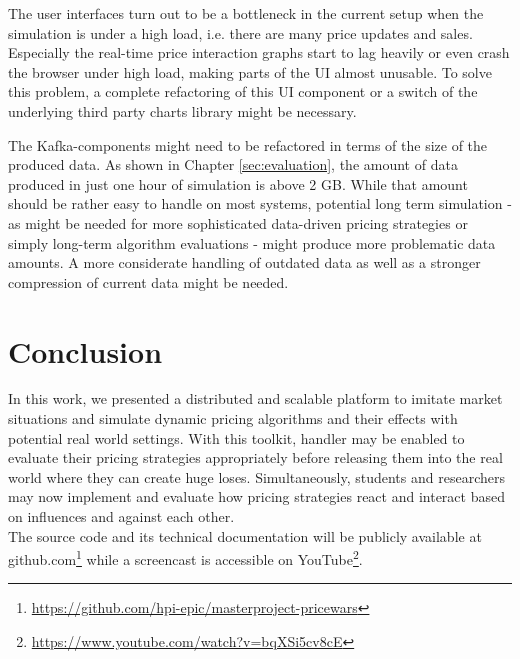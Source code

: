 The user interfaces turn out to be a bottleneck in the current setup when the simulation is under a high load, i.e. there are many price updates and sales. Especially the real-time price interaction graphs start to lag heavily or even crash the browser under high load, making parts of the UI almost unusable. To solve this problem, a complete refactoring of this UI component or a switch of the underlying third party charts library might be necessary.

The Kafka-components might need to be refactored in terms of the size of the produced data. As shown in Chapter \ref{sec:evaluation}, the amount of data produced in just one hour of simulation is above 2 GB. While that amount should be rather easy to handle on most systems, potential long term simulation - as might be needed for more sophisticated data-driven pricing strategies or simply long-term algorithm evaluations - might produce more problematic data amounts. A more considerate handling of outdated data as well as a stronger compression of current data might be needed. 



\section{Conclusion}
\label{sec:conclusion}
%
In this work, we presented a distributed and scalable platform to imitate market situations and simulate dynamic pricing algorithms and their effects with potential real world settings. With this toolkit, handler may be enabled to evaluate their pricing strategies appropriately before releasing them into the real world where they can create huge loses. Simultaneously, students and researchers may now implement and evaluate how pricing strategies react and interact based on influences and against each other.\\

The source code and its technical documentation will be publicly available at github.com\footnote{\url{https://github.com/hpi-epic/masterproject-pricewars}}
while a screencast is accessible on YouTube\footnote{\url{https://www.youtube.com/watch?v=bqXSi5cv8cE}}.

